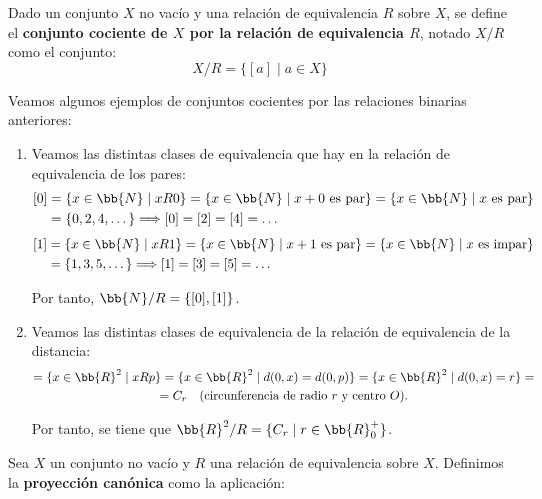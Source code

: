 \begin{definicion}
    Dado un conjunto $X$ no vacío y una relación de equivalencia $R$ sobre $X$, se define el
    \textbf{conjunto cociente de $X$ por la relación de equivalencia $R$}, notado $X/R$ como el conjunto:
    $$X/R = \{[a] \mid a \in X\}$$
\end{definicion}

\begin{ejemplo} Veamos algunos ejemplos de conjuntos cocientes por las relaciones binarias anteriores:
\begin{enumerate}
    \item[2.] Veamos las distintas clases de equivalencia que hay en la relación de equivalencia de los pares:
    \begin{equation*}
        \begin{split}
            [0] &= \{x\in \bb{N} \mid xR0\} = \{x\in \bb{N}\mid x+0 \text{ es par}\} = \{x\in \bb{N}\mid x \text{ es par}\} \\&= \{0,2,4,\dots\} \Longrightarrow [0]=[2]=[4]=\dots
        \end{split}
    \end{equation*}
    \begin{equation*}
        \begin{split}
            [1] &= \{x\in \bb{N} \mid xR1\} = \{x\in \bb{N}\mid x+1 \text{ es par}\} = \{x\in \bb{N}\mid x \text{ es impar}\} \\&= \{1,3,5,\dots\} \Longrightarrow [1]=[3]=[5]=\dots
        \end{split}
    \end{equation*}

    Por tanto, $\displaystyle \bb{N}/R = \{[0],[1]\}$.

    \item[3.] Veamos las distintas clases de equivalencia de la relación de equivalencia de la distancia:
    \begin{multline*}
        [p] = \{x\in \bb{R}^2\mid xRp\} = \{x\in \bb{R}^2\mid d(0,x)=d(0,p)\} = \{x\in \bb{R}^2\mid d(0,x)=r\} =\\= C_r \quad \text{(circunferencia de radio $r$ y centro $O$)}.
    \end{multline*}

    Por tanto, se tiene que $\displaystyle \bb{R}^2/R = \{C_r\mid r\in \bb{R}^+_0\}$.
\end{enumerate}
\end{ejemplo}

\begin{definicion}
    Sea $X$ un conjunto no vacío y $R$ una relación de equivalencia sobre $X$. Definimos la \textbf{proyección canónica} como la aplicación:
\end{definicion}

